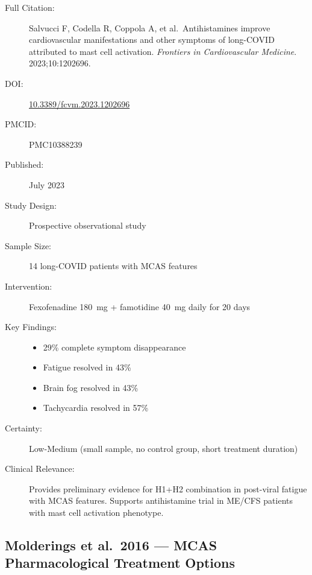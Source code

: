 \begin{description}
    \item[Full Citation:] Salvucci F, Codella R, Coppola A, et al.\ Antihistamines improve cardiovascular manifestations and other symptoms of long-COVID attributed to mast cell activation. \textit{Frontiers in Cardiovascular Medicine}. 2023;10:1202696.
    \item[DOI:] \href{https://doi.org/10.3389/fcvm.2023.1202696}{10.3389/fcvm.2023.1202696}
    \item[PMCID:] PMC10388239
    \item[Published:] July 2023
    \item[Study Design:] Prospective observational study
    \item[Sample Size:] 14 long-COVID patients with MCAS features
    \item[Intervention:] Fexofenadine 180~mg + famotidine 40~mg daily for 20 days
    \item[Key Findings:]
    \begin{itemize}
        \item 29\% complete symptom disappearance
        \item Fatigue resolved in 43\%
        \item Brain fog resolved in 43\%
        \item Tachycardia resolved in 57\%
    \end{itemize}
    \item[Certainty:] Low-Medium (small sample, no control group, short treatment duration)
    \item[Clinical Relevance:] Provides preliminary evidence for H1+H2 combination in post-viral fatigue with MCAS features. Supports antihistamine trial in ME/CFS patients with mast cell activation phenotype.
\end{description}

\subsection{Molderings et al.\ 2016 --- MCAS Pharmacological Treatment Options}

